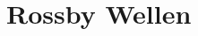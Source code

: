 %
%
%
%
\chapter{Rossby Wellen\label{chapter:rossby}}
\begin{refsection}




\printbibliography[heading=subbibliography]
\end{refsection}
